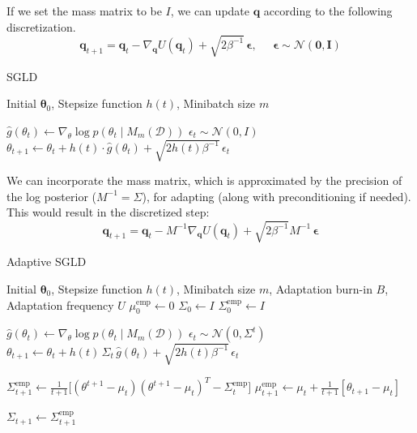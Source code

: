     If we set the mass matrix to be $I$, we can update $\mathbf{q}$ according to the following discretization. 
    \begin{equation}
      \mathbf{q}_{t+1} = \mathbf{q}_t - \nabla_{\mathbf{q}} U(\mathbf{q}_t) + \sqrt{2 \beta^{-1}} \, \boldsymbol{\epsilon}, \;\;\;\;\; \boldsymbol{\epsilon} \sim \mathcal{N}(\mathbf{0}, \mathbf{I})
    \end{equation}

    \begin{algorithm}
      \caption{SGLD}\label{alg:sgld}
      \begin{algorithmic}

      \Require Initial $\boldsymbol{\theta}_0$, Stepsize function $h(t)$, Minibatch size $m$

          \State $\hat{g}(\theta_t) \gets \nabla_\theta \log{p(\theta_t \mid M_m(\mathcal{D}))}$
          \State $\epsilon_t \sim \mathcal{N}(0, I)$
          \State $\theta_{t+1} \gets \theta_t + h(t) \cdot \hat{g}(\theta_t) + \sqrt{2 h(t) \beta^{-1}} \, \epsilon_t$
      \EndFor

      \end{algorithmic}
    \end{algorithm}

    We can incorporate the mass matrix, which is approximated by the precision of the log posterior ($M^{-1} = \Sigma$), for adapting (along with preconditioning if needed). This would result in the discretized step: 
    \begin{equation}
      \mathbf{q}_{t+1} = \mathbf{q}_t - M^{-1} \nabla_{\mathbf{q}} U(\mathbf{q}_t) + \sqrt{2 \beta^{-1}} M^{-1} \, \boldsymbol{\epsilon}
    \end{equation}

    \begin{algorithm}
      \caption{Adaptive SGLD}\label{alg:adaptive_sgld}
      \begin{algorithmic}

      \Require Initial $\boldsymbol{\theta}_0$, Stepsize function $h(t)$, Minibatch size $m$, Adaptation burn-in $B$, Adaptation frequency $U$
      \State $\mu_0^{\mathrm{emp}} \gets 0$
      \State $\Sigma_0 \gets I$
      \State $\Sigma_0^{\mathrm{emp}} \gets I$

          \State $\hat{g}(\theta_t) \gets \nabla_\theta \log{p(\theta_t \mid M_m(\mathcal{D}))}$
          \State $\epsilon_t \sim \mathcal{N}(0, \Sigma^t)$
          \State $\theta_{t+1} \gets \theta_t + h(t) \, \Sigma_t \, \hat{g}(\theta_t) + \sqrt{2 h(t) \beta^{-1}} \, \epsilon_t$
          
          \State $\Sigma^\mathrm{emp}_{t+1} \gets \frac{1}{t+1} \big[(\theta^{t+1} - \mu_t) (\theta^{t+1} - \mu_t)^T - \Sigma^\mathrm{emp}_t \big]$
          \State $\mu_{t+1}^\mathrm{emp} \gets \mu_t + \frac{1}{t+1} [ \theta_{t+1} - \mu_t ]$
          
              \State $\Sigma_{t+1} \gets \Sigma_{t+1}^{\mathrm{emp}}$
          \EndIf
      \EndFor

      \end{algorithmic}
    \end{algorithm}

